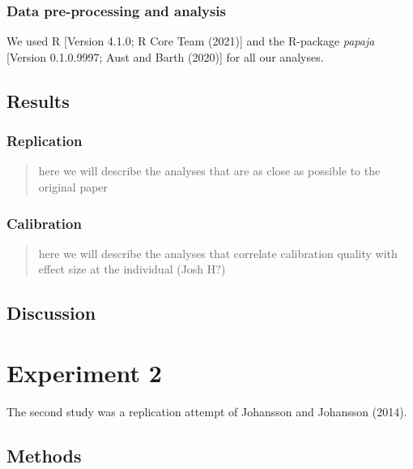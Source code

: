 \documentclass[
  english,
  man]{apa6}
\begin{document}
\hypertarget{data-pre-processing-and-analysis}{%
\subsubsection{Data pre-processing and analysis}\label{data-pre-processing-and-analysis}}

We used R {[}Version 4.1.0; R Core Team (2021){]} and the R-package \emph{papaja} {[}Version 0.1.0.9997; Aust and Barth (2020){]} for all our analyses.

\hypertarget{results}{%
\subsection{Results}\label{results}}

\hypertarget{replication}{%
\subsubsection{Replication}\label{replication}}

\begin{quote}
here we will describe the analyses that are as close as possible to the original paper
\end{quote}

\hypertarget{calibration}{%
\subsubsection{Calibration}\label{calibration}}

\begin{quote}
here we will describe the analyses that correlate calibration quality with effect size at the individual (Josh H?)
\end{quote}

\hypertarget{discussion}{%
\subsection{Discussion}\label{discussion}}

\hypertarget{experiment-2}{%
\section{Experiment 2}\label{experiment-2}}

The second study was a replication attempt of Johansson and Johansson (2014).

\hypertarget{methods-1}{%
\subsection{Methods}\label{methods-1}}
\end{document}
